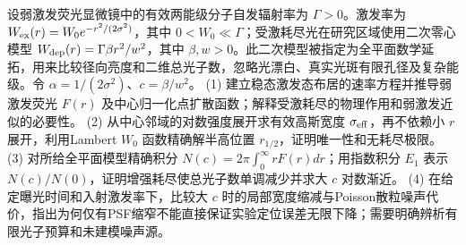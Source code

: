 设弱激发荧光显微镜中的有效两能级分子自发辐射率为 \(\Gamma>0\)。激发率为 \(W_{\rm ex}(r)=W_0e^{-r^2/(2\sigma^2)}\)，其中 \(0<W_0\ll\Gamma\)；受激耗尽光在研究区域使用二次零心模型 \(W_{\rm dep}(r)=\Gamma\beta r^2/w^2\)，其中 \(\beta,w>0\)。此二次模型被指定为全平面数学延拓，用来比较径向亮度和二维总光子数，忽略光漂白、真实光斑有限孔径及复杂能级。令 \(\alpha=1/(2\sigma^2)\)、\(c=\beta/w^2\)。
(1) 建立稳态激发态布居的速率方程并推导弱激发荧光 \(F(r)\) 及中心归一化点扩散函数；解释受激耗尽的物理作用和弱激发近似的必要性。
(2) 从中心邻域的对数强度展开求有效高斯宽度 \(\sigma_{\rm eff}\)，再不依赖小 \(r\) 展开，利用Lambert \(W_0\) 函数精确解半高位置 \(r_{1/2}\)，证明唯一性和无耗尽极限。
(3) 对所给全平面模型精确积分 \(N(c)=2\pi\int_0^\infty rF(r)dr\)；用指数积分 \(E_1\) 表示 \(N(c)/N(0)\)，证明增强耗尽使总光子数单调减少并求大 \(c\) 对数渐近。
(4) 在给定曝光时间和入射激发率下，比较大 \(c\) 时的局部宽度缩减与Poisson散粒噪声代价，指出为何仅有PSF缩窄不能直接保证实验定位误差无限下降；需要明确辨析有限光子预算和未建模噪声源。